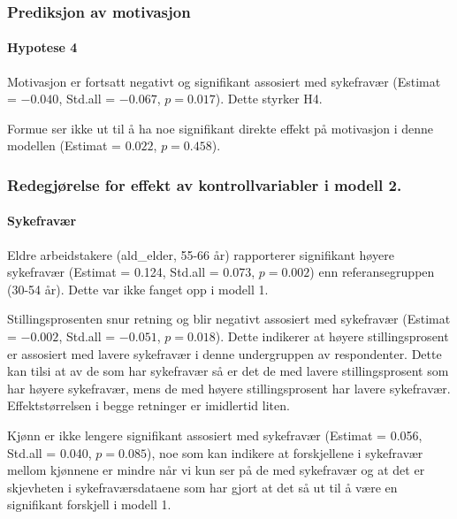 \documentclass[
  12pt,
  a4paper,
  DIV=11,
  numbers=noendperiod]{scrartcl}
\let\oldparagraph\paragraph
\renewcommand{\paragraph}[1]{\oldparagraph{#1}\mbox{}}
\begin{document}
\subsubsection{Prediksjon av
motivasjon}\label{prediksjon-av-motivasjon-1}

\paragraph{Hypotese 4}\label{hypotese-4-1}

Motivasjon er fortsatt negativt og signifikant assosiert med sykefravær
(Estimat = \(-0.040\), Std.all = \(-0.067\), \(p = 0.017\)). Dette
styrker H4.

Formue ser ikke ut til å ha noe signifikant direkte effekt på motivasjon
i denne modellen (Estimat = \(0.022\), \(p = 0.458\)).

\subsubsection{Redegjørelse for effekt av kontrollvariabler i modell
2.}\label{redegjuxf8relse-for-effekt-av-kontrollvariabler-i-modell-2.}

\paragraph{Sykefravær}\label{sykefravuxe6r-2}

Eldre arbeidstakere (ald\_elder, 55-66 år) rapporterer signifikant
høyere sykefravær (Estimat = 0.124, Std.all = 0.073, \(p = 0.002\)) enn
referansegruppen (30-54 år). Dette var ikke fanget opp i modell 1.

Stillingsprosenten snur retning og blir negativt assosiert med
sykefravær (Estimat = \(-0.002\), Std.all = \(-0.051\), \(p = 0.018\)).
Dette indikerer at høyere stillingsprosent er assosiert med lavere
sykefravær i denne undergruppen av respondenter. Dette kan tilsi at av
de som har sykefravær så er det de med lavere stillingsprosent som har
høyere sykefravær, mens de med høyere stillingsprosent har lavere
sykefravær. Effektstørrelsen i begge retninger er imidlertid liten.

Kjønn er ikke lengere signifikant assosiert med sykefravær (Estimat =
0.056, Std.all = 0.040, \(p = 0.085\)), noe som kan indikere at
forskjellene i sykefravær mellom kjønnene er mindre når vi kun ser på de
med sykefravær og at det er skjevheten i sykefraværsdataene som har
gjort at det så ut til å være en signifikant forskjell i modell 1.
\end{document}
